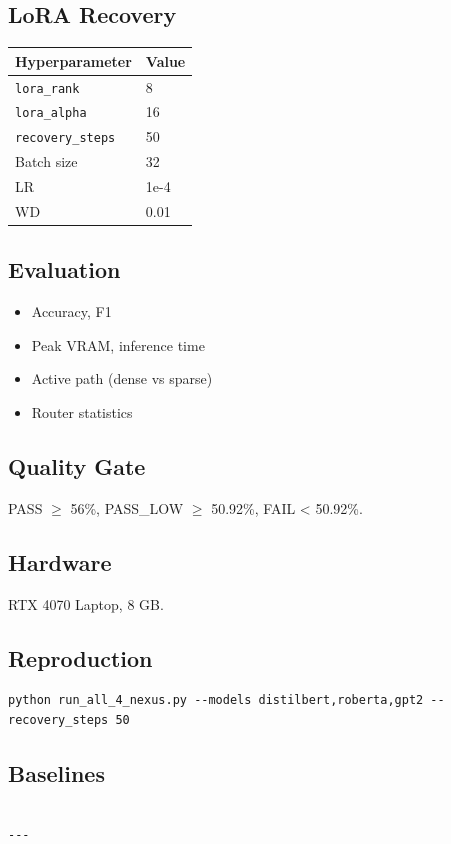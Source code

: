 \subsection{LoRA Recovery}

\begin{table}[H]
\centering
\small
\begin{tabular}{ll}
\toprule
\textbf{Hyperparameter} & \textbf{Value} \\
\midrule
\texttt{lora\_rank} & 8 \\
\texttt{lora\_alpha} & 16 \\
\texttt{recovery\_steps} & 50 \\
Batch size & 32 \\
LR & 1e-4 \\
WD & 0.01 \\
\bottomrule
\end{tabular}
\end{table}

\subsection{Evaluation}

\begin{itemize}
\item Accuracy, F1
\item Peak VRAM, inference time
\item Active path (dense vs sparse)
\item Router statistics

\end{itemize}
\subsection{Quality Gate}

PASS $\ge$ 56\%, PASS\_LOW $\ge$ 50.92\%, FAIL < 50.92\%.

\subsection{Hardware}

RTX 4070 Laptop, 8 GB.

\subsection{Reproduction}

\begin{lstlisting}
python run_all_4_nexus.py --models distilbert,roberta,gpt2 --recovery_steps 50
\end{lstlisting}

\subsection{Baselines}

\begin{lstlisting}

---
\end{lstlisting}